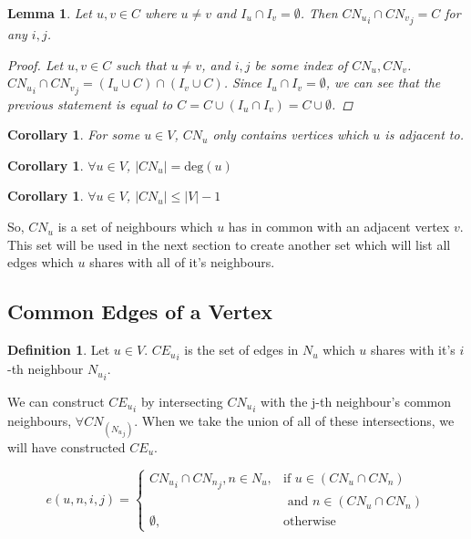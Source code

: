 \documentclass{article}
\theoremstyle{plain}
\newtheorem{lem}[thm]{Lemma}
\newtheorem{cor}[thm]{Corollary}
\theoremstyle{definition}
\newtheorem{defn}{Definition}[]
\theoremstyle{remark}
\newcommand{\cn}[1]{ {{CN}_{#1}} }
\newcommand{\ce}[1]{ {{CE}_{#1}} }
\newcommand{\vdeg}[1]{ {\text{deg}({#1})} }
\newcommand{\ignv}[1]{ {I_{#1}} }
\newcommand{\nev}[1]{ {N_{#1}} }
\begin{document}
\begin{lem}
    Let \(u, v \in C\) where \(u \neq v\) and \(\ignv{u} \cap \ignv{v} = \emptyset\). Then
    \(\cn{u}_i \cap \cn{v}_j = C\) for any \(i, j\).
    \label{cn_no_common}
    \begin{proof}
        Let \(u, v \in C\) such that \(u \neq v\), and \(i,j\) be some index of \(\cn{u},
        \cn{v}\). \(\cn{u}_i \cap \cn{v}_j = (\ignv{u} \cup C) \cap (\ignv{v} \cup C)\).
        Since \(\ignv{u} \cap \ignv{v} = \emptyset\), we can see that the previous
        statement is equal to \(C = C \cup (\ignv{u} \cap \ignv{v}) = C \cup \emptyset\).
    \end{proof}
\end{lem}

\begin{cor}
    For some \(u \in V\), \(\cn{u}\) only contains vertices which \(u\) is adjacent to.
    \label{cn_exclusive_neighbours}
\end{cor}

\begin{cor}
    \(\forall u \in V\), \(|\cn{u}| = \vdeg{u}\)
\end{cor}
\begin{cor}
    \(\forall u \in V\), \(|\cn{u}| \leq |V| - 1\)
    \label{max_cn}
\end{cor}

So, \(\cn{u}\) is a set of neighbours which \(u\) has in common with an adjacent vertex
\(v\). This set will be used in the next section to create another set which will list all
edges which \(u\) shares with all of it's neighbours.

\subsection{Common Edges of a Vertex}

\begin{defn}
    Let \(u \in V\). \(\ce{u}_i\) is the set of edges in \(\nev{u}\) which \(u\) shares
    with it's \(i\)-th neighbour \({\nev{u}}_i\).
\end{defn}

We can construct \(\ce{u}_i\) by intersecting \(\cn{u}_i\) with the j-th neighbour's
common neighbours, \(\forall \cn{(\nev{u}_j)}\). When we take the union of all of these
intersections, we will have constructed \(\ce{u}\).

\begin{equation}
    e(u, n, i, j) =
    \begin{cases}
        \cn{u}_i \cap {\cn{n}}_j,n \in \nev{u},&
            \text{if } u \in (\cn{u} \cap \cn{n}) \\
            & \text{ and } n \in (\cn{u} \cap \cn{n})
        \\
        \emptyset,& \text{otherwise}
    \end{cases}
    \label{edge_construction}
\end{equation}
\end{document}
